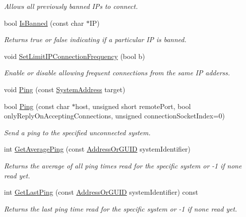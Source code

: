 \begin{DoxyCompactItemize}
\begin{DoxyCompactList}\small\item\em Allows all previously banned I\-Ps to connect. \end{DoxyCompactList}\item 
bool \hyperlink{class_rak_net_1_1_rak_peer_a499626110e1409b09e7d955722c4c3fd}{Is\-Banned} (const char $\ast$I\-P)
\begin{DoxyCompactList}\small\item\em Returns true or false indicating if a particular I\-P is banned. \end{DoxyCompactList}\item 
void \hyperlink{class_rak_net_1_1_rak_peer_ac5e80ab105ac8124d4ee5f94bd1b316a}{Set\-Limit\-I\-P\-Connection\-Frequency} (bool b)
\begin{DoxyCompactList}\small\item\em Enable or disable allowing frequent connections from the same I\-P adderss. \end{DoxyCompactList}\item 
void \hyperlink{class_rak_net_1_1_rak_peer_a9bb94828e0ad89e0d6c44a671bf22f8d}{Ping} (const \hyperlink{struct_rak_net_1_1_system_address}{System\-Address} target)
\item 
bool \hyperlink{class_rak_net_1_1_rak_peer_af7dd13a4c3d38e65bf816a604c6042c7}{Ping} (const char $\ast$host, unsigned short remote\-Port, bool only\-Reply\-On\-Accepting\-Connections, unsigned connection\-Socket\-Index=0)
\begin{DoxyCompactList}\small\item\em Send a ping to the specified unconnected system. \end{DoxyCompactList}\item 
int \hyperlink{class_rak_net_1_1_rak_peer_a2b735d6075d64dcdf5c554989f4a5f98}{Get\-Average\-Ping} (const \hyperlink{struct_rak_net_1_1_address_or_g_u_i_d}{Address\-Or\-G\-U\-I\-D} system\-Identifier)
\begin{DoxyCompactList}\small\item\em Returns the average of all ping times read for the specific system or -\/1 if none read yet. \end{DoxyCompactList}\item 
int \hyperlink{class_rak_net_1_1_rak_peer_a7a21e884778d65fb4493b29e5c1826c5}{Get\-Last\-Ping} (const \hyperlink{struct_rak_net_1_1_address_or_g_u_i_d}{Address\-Or\-G\-U\-I\-D} system\-Identifier) const 
\begin{DoxyCompactList}\small\item\em Returns the last ping time read for the specific system or -\/1 if none read yet. \end{DoxyCompactList}\item 

\end{DoxyCompactItemize}
